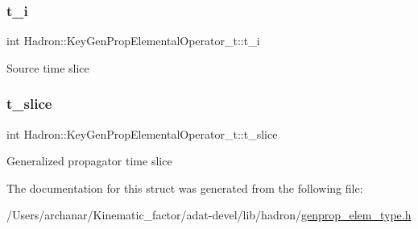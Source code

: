 \subsubsection{\texorpdfstring{t\_i}{t\_i}}
{\footnotesize\ttfamily int Hadron\+::\+Key\+Gen\+Prop\+Elemental\+Operator\+\_\+t\+::t\+\_\+i}

Source time slice \mbox{\label{structHadron_1_1KeyGenPropElementalOperator__t_aa25e47bfba87915da35d3379689bb2c9}} 
\subsubsection{\texorpdfstring{t\_slice}{t\_slice}}
{\footnotesize\ttfamily int Hadron\+::\+Key\+Gen\+Prop\+Elemental\+Operator\+\_\+t\+::t\+\_\+slice}

Generalized propagator time slice 

The documentation for this struct was generated from the following file\+:\begin{DoxyCompactItemize}
\item 
/\+Users/archanar/\+Kinematic\+\_\+factor/adat-\/devel/lib/hadron/\mbox{\hyperlink{adat-devel_2lib_2hadron_2genprop__elem__type_8h}{genprop\+\_\+elem\+\_\+type.\+h}}\end{DoxyCompactItemize}
